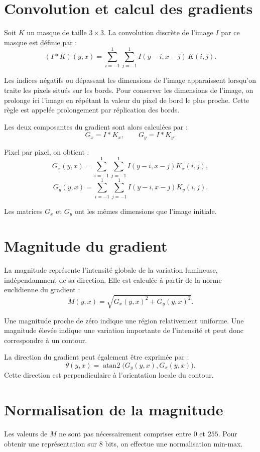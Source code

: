 \documentclass[11pt,a4paper]{article}
\begin{document}
\section{Convolution et calcul des gradients}

Soit $K$ un masque de taille $3\times3$. La convolution discrète de l'image
$I$ par ce masque est définie par :
\[
    (I*K)(y,x)=
    \sum_{i=-1}^{1}\sum_{j=-1}^{1}
    I(y-i,x-j)\,K(i,j).
\]

Les indices négatifs ou dépassant les dimensions de l'image apparaissent
lorsqu'on traite les pixels situés sur les bords. Pour conserver les
dimensions de l'image, on prolonge ici l'image en répétant la valeur du
pixel de bord le plus proche. Cette règle est appelée prolongement par
réplication des bords.

Les deux composantes du gradient sont alors calculées par :
\[
    G_x=I*K_x,
    \qquad
    G_y=I*K_y.
\]

Pixel par pixel, on obtient :
\[
    G_x(y,x)=
    \sum_{i=-1}^{1}\sum_{j=-1}^{1}
    I(y-i,x-j)K_x(i,j),
\]
\[
    G_y(y,x)=
    \sum_{i=-1}^{1}\sum_{j=-1}^{1}
    I(y-i,x-j)K_y(i,j).
\]

Les matrices $G_x$ et $G_y$ ont les mêmes dimensions que l'image initiale.

\section{Magnitude du gradient}

La magnitude représente l'intensité globale de la variation lumineuse,
indépendamment de sa direction. Elle est calculée à partir de la norme
euclidienne du gradient :
\[
    M(y,x)=\sqrt{G_x(y,x)^2+G_y(y,x)^2}.
\]

Une magnitude proche de zéro indique une région relativement uniforme.
Une magnitude élevée indique une variation importante de l'intensité et
peut donc correspondre à un contour.

La direction du gradient peut également être exprimée par :
\[
    \theta(y,x)=
    \operatorname{atan2}\bigl(G_y(y,x),G_x(y,x)\bigr).
\]
Cette direction est perpendiculaire à l'orientation locale du contour.

\section{Normalisation de la magnitude}

Les valeurs de $M$ ne sont pas nécessairement comprises entre $0$ et $255$.
Pour obtenir une représentation sur 8 bits, on effectue une normalisation
min-max.
\end{document}
